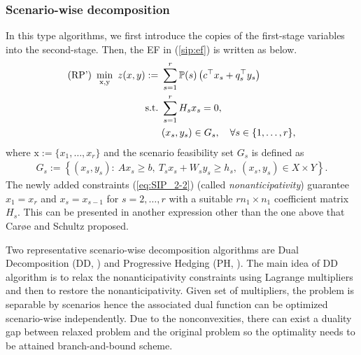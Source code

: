 \subsubsection{Scenario-wise decomposition}
In this type algorithms, we first introduce the copies of the first-stage variables into the second-stage. Then, the EF in (\ref{sip:ef}) is written as below.
\begin{subequations} \label{sip:ef'}
	\begin{align}
	\textrm{(RP') }\min_{\mathrm{x},\mathrm{y}}\ z(x,y):=\ &\sum_{s=1}^{r}\PP(s)\left(c^{\top}x_s+q_s^{\top}y_s\right)	\label{eq:SIP_2-1}\\ 
	\mathrm{s.t.}\ &\sum_{s=1}^{r}H_s x_s=0, \label{eq:SIP_2-2} \\
	\ &(x_s,y_s)\in G_s,\quad \forall s\in\{1,\ldots,r\},	\label{eq:SIP_2-3}
	\end{align}
\end{subequations}
where $\mathrm{x}:=\{x_1,\ldots,x_r\}$ and the scenario feasibility set $G_s$ is defined as
\begin{align} 
G_s:=\left\{ (x_s,y_s): \ Ax_s\ge b,\  T_s x_s+W_s y_s\ge h_s,\ (x_s,y_s)\in X\times Y  \right\}. \label{eq:SIP_2-4}
\end{align}
The newly added constraints (\ref{eq:SIP_2-2}) (called \textit{nonanticipativity}) guarantee $x_1=x_r$ and $x_s=x_{s-1}$ for $s=2,\ldots,r$ with a suitable $rn_1\times n_1$ coefficient matrix $H_s$. This can be presented in another expression other than the one above that Car\o e and Schultz \cite{CS1999} proposed.

Two representative scenario-wise decomposition algorithms are Dual Decomposition (DD, \cite{CS1999}) and Progressive Hedging (PH, \cite{RW1991}). The main idea of DD algorithm is to relax the nonanticipativity constraints using Lagrange multipliers and then to restore the nonanticipativity. Given set of multipliers, the problem is separable by scenarios hence the associated dual function can be optimized scenario-wise independently. Due to the nonconvexities, there can exist a duality gap between relaxed problem and the original problem so the optimality needs to be attained branch-and-bound scheme.

